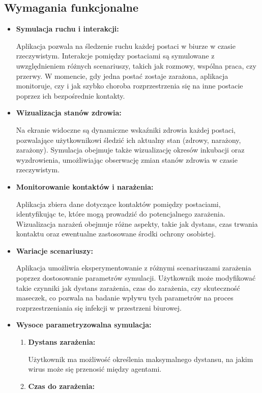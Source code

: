 \subsection{\textbf{Wymagania funkcjonalne}}
\begin{itemize}
	\item \textbf{ Symulacja ruchu i interakcji:}
	
	Aplikacja pozwala na śledzenie ruchu każdej postaci w biurze w czasie rzeczywistym.
	Interakcje pomiędzy postaciami są symulowane z uwzględnieniem różnych scenariuszy, takich jak rozmowy, wspólna praca, czy przerwy.
	W momencie, gdy jedna postać zostaje zarażona, aplikacja monitoruje, czy i jak szybko choroba rozprzestrzenia się na inne postacie poprzez ich bezpośrednie kontakty.
	\item \textbf{Wizualizacja stanów zdrowia:}
	
	Na ekranie widoczne są dynamiczne wskaźniki zdrowia każdej postaci, pozwalające użytkownikowi śledzić ich aktualny stan (zdrowy, narażony, zarażony).
	Symulacja obejmuje także wizualizację okresów inkubacji oraz wyzdrowienia, umożliwiając obserwację zmian stanów zdrowia w czasie rzeczywistym.
	\item \textbf{Monitorowanie kontaktów i narażenia:}
	
	Aplikacja zbiera dane dotyczące kontaktów pomiędzy postaciami, identyfikując te, które mogą prowadzić do potencjalnego zarażenia.
	Wizualizacja narażeń obejmuje różne aspekty, takie jak dystans, czas trwania kontaktu oraz ewentualne zastosowane środki ochrony osobistej.
	\item \textbf{Wariacje scenariuszy:}
	
	Aplikacja umożliwia eksperymentowanie z różnymi scenariuszami zarażenia poprzez dostosowanie parametrów symulacji. Użytkownik może modyfikować takie czynniki jak dystans zarażenia, czas do zarażenia, czy skuteczność maseczek, co pozwala na badanie wpływu tych parametrów na proces rozprzestrzeniania się infekcji w przestrzeni biurowej.

	\item \textbf{Wysoce parametryzowalna symulacja:}
	\begin{enumerate}
		\item \textbf{Dystans zarażenia:}
		
		Użytkownik ma możliwość określenia maksymalnego dystansu, na jakim wirus może się przenosić między agentami.
		\item \textbf{Czas do zarażenia:}
		

\end{enumerate}
\end{itemize}
